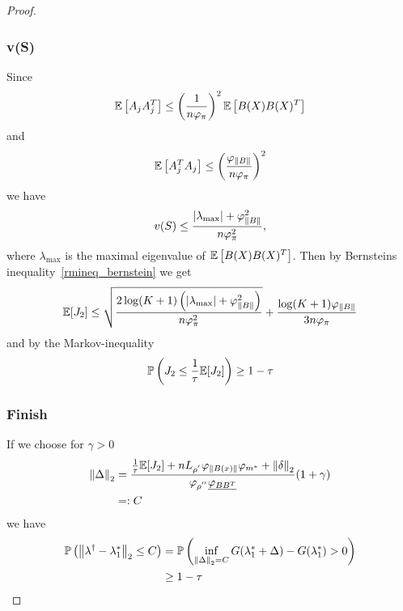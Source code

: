 \begin{proof}
\subsubsection*{v(S)}
Since
\begin{gather}
  \mathbb{E}
  \left[ 
    A_j A_j^T
  \right]
  \le
  \left( 
    \frac{1}{n \varphi_{\pi}}
  \right)^2
  \mathbb{E}
  \left[ 
    B(X) B(X)^T
  \right]
\end{gather}
and
\begin{gather}
  \mathbb{E}
  \left[ 
    A_j^T A_j
  \right]
  \le
  \left( 
    \frac{\varphi_{\left\lVert B\right\rVert}}{n \varphi_{\pi}}
  \right)^2
\end{gather}
we have
\begin{gather}
  v(S)
  \le
  \frac{|\lambda_{\max} | + \varphi_{\left\lVert B\right\rVert}^2}{n \varphi_{\pi}^2},
\end{gather}
where 
$\lambda_{\max}$ is the maximal eigenvalue of
$
  \mathbb{E}
  \left[ 
    B(X) B(X)^T
  \right]
$.
Then by Bernsteins inequality~\ref{rmineq_bernstein}
we get
\begin{gather}
  \mathbb{E}[J_2]
  \le
  \sqrt{
    \frac{
    2 \log (K + 1)
    \left( 
      |\lambda_{\max} | + \varphi_{\left\lVert B\right\rVert}^2
    \right)
    }
    {
      n \varphi_{\pi}^2
    }
  }
  +
  \frac{
    \log (K + 1)
    \varphi_{\left\lVert B\right\rVert}
  }
  {
    3 n \varphi_{\pi}
  }
\end{gather}
and by the Markov-inequality
\begin{gather}
  \mathbb{P}
  \left( 
    J_2 
    \le
    \frac{1}{\tau}
    \mathbb{E}[J_2]
  \right)
  \ge 
  1 - \tau
\end{gather}
\subsubsection*{Finish}
If we choose for $\gamma > 0$
\begin{align}
  \left\lVert\Delta\right\rVert_2
  &=
  \frac{
    \frac{1}{\tau}
    \mathbb{E}[J_2]
    +
    n L_{\rho^{'}}\varphi_{\left\lVert B(x)\right\rVert} \varphi_{m^*}
    +
    \left\lVert\delta\right\rVert_2
  }
  {
   \varphi_{\rho^{''}}
  \underline{\varphi_{BB^T}}
  }
  (1 + \gamma)
  \\
  &=:
  C
\end{align}
we have
\begin{align}
  \mathbb{P}
  \left( 
      \left\lVert
        \lambda^\dagger
        -
        \lambda^*_1
      \right\rVert_2
      \le
      C 
  \right)
  &=
  \mathbb{P}
  \left( 
    \inf_{\left\lVert\Delta\right\rVert_2 = C}
    G(\lambda^*_1 + \Delta) 
    -
    G(\lambda^*_1)
    >
    0
  \right)
  \\
  &\ge
  1 - \tau
\end{align}

\end{proof}
